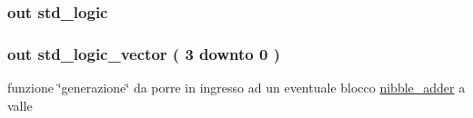 \subsubsection[{\texorpdfstring{propout}{propout}}]{ {\bfseries \textcolor{vhdlchar}{out}\textcolor{vhdlchar}{ }} {\bfseries \textcolor{vhdlchar}{std\+\_\+logic}\textcolor{vhdlchar}{ }} \hspace{0.3cm}{\ttfamily [Port]}}\hypertarget{group___nibble_adder_ga5957c9cdd706cafd2da8855133a002c9}{}\label{group___nibble_adder_ga5957c9cdd706cafd2da8855133a002c9}
\subsubsection[{\texorpdfstring{sum}{sum}}]{ {\bfseries \textcolor{vhdlchar}{out}\textcolor{vhdlchar}{ }} {\bfseries \textcolor{vhdlchar}{std\+\_\+logic\+\_\+vector}\textcolor{vhdlchar}{ }\textcolor{vhdlchar}{(}\textcolor{vhdlchar}{ }\textcolor{vhdlchar}{ } \textcolor{vhdldigit}{3} \textcolor{vhdlchar}{ }\textcolor{vhdlchar}{downto}\textcolor{vhdlchar}{ }\textcolor{vhdlchar}{ } \textcolor{vhdldigit}{0} \textcolor{vhdlchar}{ }\textcolor{vhdlchar}{)}\textcolor{vhdlchar}{ }} \hspace{0.3cm}{\ttfamily [Port]}}\hypertarget{group___nibble_adder_gadfe538323c3296159dd3b383325a996b}{}\label{group___nibble_adder_gadfe538323c3296159dd3b383325a996b}
funzione \char`\"{}generazione\char`\"{} da porre in ingresso ad un eventuale blocco \hyperlink{classnibble__adder}{nibble\+\_\+adder} a valle 